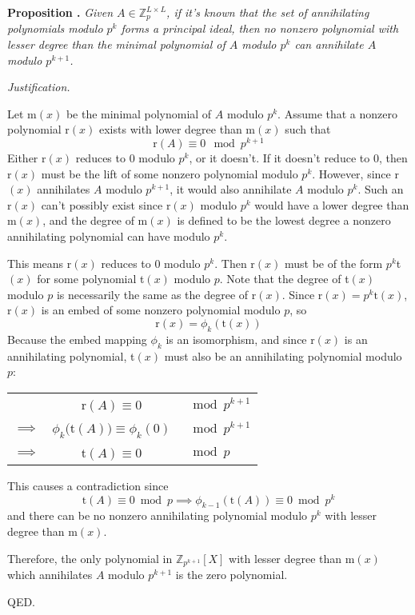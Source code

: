 \documentclass[a4paper, 12pt, reqno]{amsart}
\newcounter{propcounter}
\newenvironment{proposition}[1]
{
	\vspace{1em}
	\refstepcounter{propcounter} %
	\textbf{Proposition \thepropcounter.} \emph{#1}
	
	\emph{Justification.}
}
{
	QED. \\
}
\begin{document}
		\begin{proposition}{Given $A \in \mathds{Z}_{p}^{L \times L}$, if it's known that the set of annihilating polynomials modulo $p^k$ forms a principal ideal, then no 
		nonzero polynomial with lesser degree than the minimal polynomial of $A$ modulo $p^k$ can annihilate $A$ modulo $p^{k+1}$.}
			\label{prop:pkNoLowerZeros}
			Let m$(x)$ be the minimal polynomial of $A$ modulo $p^k$. Assume that a nonzero polynomial r$(x)$ exists with lower degree than m$(x)$ such that
			\[
				\text{r}(A) \equiv 0 \mod{p^{k+1}}
			\]
			Either r$(x)$ reduces to 0 modulo $p^k$, or it doesn't. If it doesn't reduce to 0, then r$(x)$ must be the lift of some nonzero polynomial modulo $p^k$. However,
			since r$(x)$ annihilates $A$ modulo $p^{k+1}$, it would also annihilate $A$ modulo $p^k$. Such an r$(x)$ can't possibly exist since r$(x)$ modulo $p^k$ would 
			have a lower degree than m$(x)$, and the degree of m$(x)$ is defined to be the lowest degree a nonzero annihilating polynomial can have modulo $p^k$.
			
			This means r$(x)$ reduces to 0 modulo $p^k$. Then r$(x)$ must be of the form $p^k$t$(x)$ for some polynomial t$(x)$ modulo $p$. Note that the degree of t$(x)$ 
			modulo $p$ is necessarily the same as the degree of r$(x)$. Since r$(x) = p^k\text{t}(x)$, r$(x)$ is an embed of some nonzero polynomial modulo $p$, so
			\[
				\text{r}(x) = \phi_k(\text{t}(x))
			\]
			Because the embed mapping $\phi_k$ is an isomorphism, and since r$(x)$ is an annihilating polynomial, t$(x)$ must also be an annihilating polynomial modulo $p$:
			\begin{center}
				\begin{tabular}{lcl}
					           & r$(A) \equiv 0$                   & $\mod{p^{k+1}}$ \\
					$\implies$ & $\phi_k($t$(A)) \equiv \phi_k(0)$ & $\mod{p^{k+1}}$ \\
					$\implies$ & t$(A) \equiv 0$                   & $\mod{p}$
				\end{tabular}
			\end{center}
			This causes a contradiction since 
			\[
				\text{t}(A) \equiv 0 \bmod{p} \implies \phi_{k-1}(\text{t}(A)) \equiv 0 \bmod{p^k}
			\]
			and there can be no nonzero annihilating polynomial modulo $p^k$ with lesser degree than m$(x)$.
			
			Therefore, the only polynomial in $\mathds{Z}_{p^{k+1}}[X]$ with lesser degree than m$(x)$ which annihilates $A$ modulo $p^{k+1}$ is the zero polynomial.
		\end{proposition}
		
\end{document}
